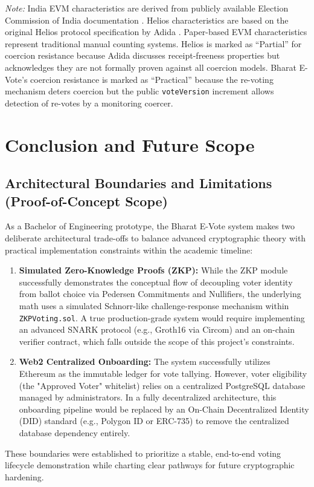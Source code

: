 \documentclass[oneside,a4paper,12pt]{book}
\begin{document}
\textit{Note:} India EVM characteristics are derived from publicly available Election Commission of India documentation \cite{eci2024}. Helios characteristics are based on the original Helios protocol specification by Adida \cite{adida2008}. Paper-based EVM characteristics represent traditional manual counting systems. Helios is marked as ``Partial'' for coercion resistance because Adida discusses receipt-freeness properties but acknowledges they are not formally proven against all coercion models. Bharat E-Vote's coercion resistance is marked as ``Practical'' because the re-voting mechanism deters coercion but the public \texttt{voteVersion} increment allows detection of re-votes by a monitoring coercer.

\chapter{Conclusion and Future Scope}

\section{Architectural Boundaries and Limitations (Proof-of-Concept Scope)}
As a Bachelor of Engineering prototype, the Bharat E-Vote system makes two deliberate architectural trade-offs to balance advanced cryptographic theory with practical implementation constraints within the academic timeline:

\begin{enumerate}
    \item \textbf{Simulated Zero-Knowledge Proofs (ZKP):} While the ZKP module successfully demonstrates the conceptual flow of decoupling voter identity from ballot choice via Pedersen Commitments and Nullifiers, the underlying math uses a simulated Schnorr-like challenge-response mechanism within \texttt{ZKPVoting.sol}. A true production-grade system would require implementing an advanced SNARK protocol (e.g., Groth16 via Circom) and an on-chain verifier contract, which falls outside the scope of this project's constraints.
    \item \textbf{Web2 Centralized Onboarding:} The system successfully utilizes Ethereum as the immutable ledger for vote tallying. However, voter eligibility (the "Approved Voter" whitelist) relies on a centralized PostgreSQL database managed by administrators. In a fully decentralized architecture, this onboarding pipeline would be replaced by an On-Chain Decentralized Identity (DID) standard (e.g., Polygon ID or ERC-735) to remove the centralized database dependency entirely.
\end{enumerate}
These boundaries were established to prioritize a stable, end-to-end voting lifecycle demonstration while charting clear pathways for future cryptographic hardening.
\end{document}
